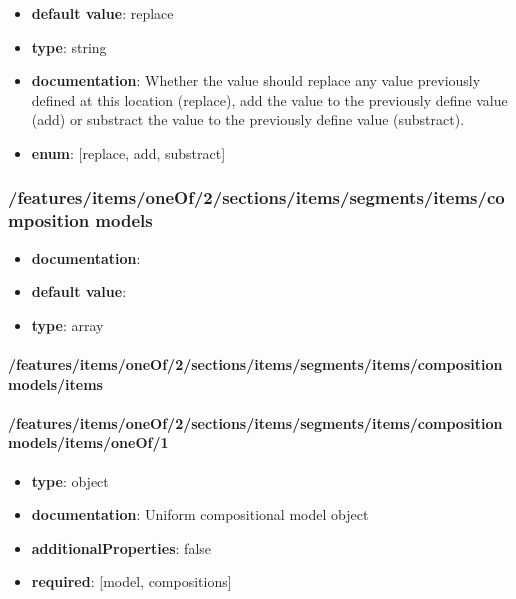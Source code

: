 \begin{itemize}\item {\bf default value}: replace
\item {\bf type}: string
\item {\bf documentation}: Whether the value should replace any value previously defined at this location (replace), add the value to the previously define value (add) or substract the value to the previously define value (substract).
\item {\bf enum}: [replace, add, substract]\end{itemize}\subsubsection{/features/items/oneOf/2/sections/items/segments/items/composition models}
\begin{itemize}\item {\bf documentation}: 
\item {\bf default value}: 
\item {\bf type}: array
\end{itemize}\paragraph{/features/items/oneOf/2/sections/items/segments/items/composition models/items}

\paragraph{/features/items/oneOf/2/sections/items/segments/items/composition models/items/oneOf/1}
\begin{itemize}\item {\bf type}: object
\item {\bf documentation}: Uniform compositional model object
\item {\bf additionalProperties}: false
\item {\bf required}: [model, compositions]\end{itemize}
